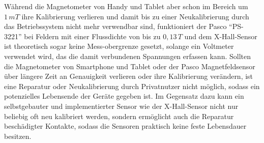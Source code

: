 \documentclass[12pt, a4paper]{article}
\begin{document}
Während die Magnetometer von Handy und Tablet aber schon im Bereich um $1\,mT$ ihre Kalibrierung verlieren und damit bis zu einer Neukalibrierung durch das Betriebssystem nicht mehr verwendbar sind, funktioniert der Pasco ``PS-3221'' bei Feldern mit einer Flussdichte von bis zu $0,13\,T$ und dem X-Hall-Sensor ist theoretisch sogar keine Mess-obergrenze gesetzt, solange ein Voltmeter verwendet wird, das die damit verbundenen Spannungen erfassen kann.\newline
Sollten die Magnetometer von Smartphone und Tablet oder der Pasco Magnetfeldsensor über längere Zeit an Genauigkeit verlieren oder ihre Kalibrierung verändern, ist eine Reparatur oder Neukalibrierung durch Privatnutzer nicht möglich, sodass ein potenzielles Lebensende der Geräte gegeben ist.\newline
Im Gegensatz dazu kann ein selbstgebauter und implementierter Sensor wie der X-Hall-Sensor nicht nur beliebig oft neu kalibriert werden, sondern ermöglicht auch die Reparatur beschädigter Kontakte, sodass die Sensoren praktisch keine feste Lebensdauer besitzen. 
\pagebreak
\end{document}
